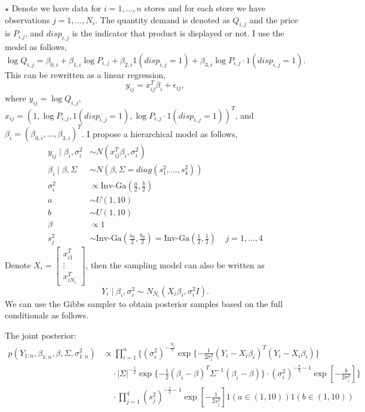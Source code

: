 \documentclass[11pt]{article}
\newcommand{\jie}{$\star$ }
\begin{document}
\bigskip \jie
Denote we have data for $i = 1, \dots, n$ stores and for each store we have observations $j= 1, \dots, N_i$. The quantity demand is denoted as $Q_{i,j}$ and the price is $P_{i.j}$, and $disp_{i,j}$ is the indicator that product is displayed or not. I use the model as follows,
$$\log Q_{i,j} = \beta_{0,i} + \beta_{1,i} \log P_{i,j} + \beta_{2,i} 1(disp_{i,j} = 1) + \beta_{3,i} \log P_{i,j} \cdot 1(disp_{i,j} = 1).$$
This can be rewritten as a linear regression,
$$y_{ij} = x_{ij}^T \beta_i + \epsilon_{ij},$$
where $y_{ij} = \log Q_{i,j}$, $x_{ij} = (1, \log P_{i,j}, 1(disp_{i,j} = 1), \log P_{i,j} \cdot 1(disp_{i,j} = 1) )^T$, and $\beta_i = (\beta_{0,i}, \dots, \beta_{3,i})^T$.
I propose a hierarchical model as follows,
\begin{align*}
    y_{ij} \mid \beta_i, \sigma_i^2 &\sim N(x_{ij}^T \beta_i, \sigma_i^2) \\
    \beta_i \mid \beta, \Sigma &\sim N(\beta, \Sigma = diag(s_1^2, \dots, s_4^2)) \\
    \sigma^2_i &\propto \text{Inv-Ga}(\frac{a}2, \frac{b}2) \\
    a &\sim U(1, 10) \\
    b &\sim U(1, 10) \\
    \beta & \propto 1  \\
    s_j^2 &\sim \text{Inv-Ga}(\frac{a_0}2, \frac{b_0}2) =  \text{Inv-Ga}(\frac{1}2, \frac{1}2) \;\;\;\; j=1,\dots, 4
\end{align*}
Denote $X_i = \begin{bmatrix}
x_{i1}^T \\
\vdots \\
x_{iN_i}^T
\end{bmatrix}$, then the sampling model can also be written as
$$Y_i \mid \beta_i, \sigma_i^2 \sim N_{N_i} (X_i \beta_i , \sigma^2_i I).$$
We can use the Gibbs sampler to obtain posterior samples based on the full conditionals as follows.

The joint posterior:
\begin{align*}
    p(Y_{1:n}, \beta_{1:n}, \beta, \Sigma, \sigma_{1:n}^2) &\propto \prod_{i=1}^n \{ (\sigma_i^2)^{-\frac{N_i}2} \exp \{ - \frac{1}{2\sigma_i^2} (Y_i - X_i \beta_i)^T(Y_i - X_i\beta_i)\}  \\& \;\;\;\; \cdot |\Sigma|^{-\frac{1}2} \exp \{ -\frac{1}2 (\beta_i - \beta)^T \Sigma^{-1} (\beta_i - \beta) \} \cdot (\sigma^2_i)^{-\frac{a}2 - 1} \exp[-\frac{b}{2\sigma^2_i}] \} \\
    &\;\;\;\; \cdot \prod_{j=1}^4 (s_j^2)^{-\frac{1}2 - 1} \exp[-\frac{1}{2s_j^2}] 1(a\in (1,10)) 1(b\in (1,10))
\end{align*}
\end{document}
